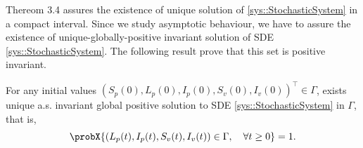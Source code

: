 Thereom 3.4 \cite[see][p. 58]{Mao2008} assures the existence of unique solution of 
\autoref{sys::StochasticSystem} in a compact interval. Since we study asymptotic behaviour, 
we have to assure the existence of unique-globally-positive invariant solution 
of SDE \autoref{sys::StochasticSystem}. The following result prove that this set is positive invariant.
%
\begin{theorem}\label{thm::existence-unique}
	For any initial values 
	$
		(S_p(0), L_p(0), I_p(0), S_v(0), I_v(0))^{\top}
		\in \Gamma
	$, 
	exists unique a.s. invariant global positive solution to SDE 
	\autoref{sys::StochasticSystem} in $\Gamma$, that is,
	\begin{equation*}
		\probX{
			(L_p(t), I_p(t), S_v(t), I_v(t)) 
			\in 
			\Gamma, \quad
			\forall t \geq 0
		} = 1.
	\end{equation*}
\end{theorem}
%
